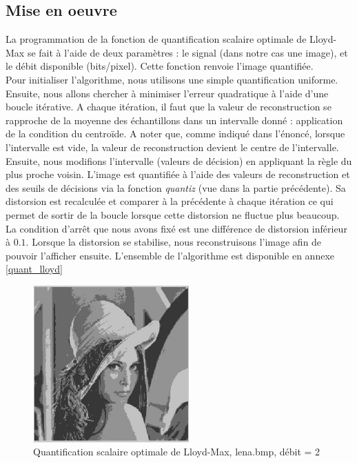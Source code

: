 \documentclass[a4paper, 12pt]{article}
\begin{document}
\subsection{Mise en oeuvre}

La programmation de la fonction de quantification scalaire optimale de Lloyd-Max se fait à l'aide de deux paramètres : le signal (dans notre cas une image), et le débit disponible (bits/pixel). Cette fonction renvoie l'image quantifiée. \\

Pour initialiser l'algorithme, nous utilisons une simple quantification uniforme. Ensuite, nous allons chercher à minimiser l'erreur quadratique à l'aide d'une boucle itérative. A chaque itération, il faut que la valeur de reconstruction se rapproche de la moyenne des échantillons dans un intervalle donné : application de la condition du centroïde. A noter que, comme indiqué dans l'énoncé, lorsque l'intervalle est vide, la valeur de reconstruction devient le centre de l'intervalle. Ensuite, nous modifions l'intervalle (valeurs de décision) en appliquant la règle du plus proche voisin. L'image est quantifiée à l'aide des valeurs de reconstruction et des seuils de décisions via la fonction \textit{quantiz} (vue dans la partie précédente). Sa distorsion est recalculée et comparer à la précédente à chaque itération ce qui permet de sortir de la boucle lorsque cette distorsion ne fluctue plus beaucoup. La condition d'arrêt que nous avons fixé est une différence de distorsion inférieur à $0.1$. Lorsque la distorsion se stabilise, nous reconstruisons l'image afin de pouvoir l'afficher ensuite. L'ensemble de l'algorithme est disponible en annexe \ref{quant_lloyd}\\

\begin{figure}[H]
	\centering
		\includegraphics[width=6cm, height=6cm]{../lena_quantlloyd_4_niveaux.jpg}
	\caption{Quantification scalaire optimale de Lloyd-Max, lena.bmp, débit = 2}
	\label{fig:lena_quant_4_niveaux}
\end{figure}
\end{document}
